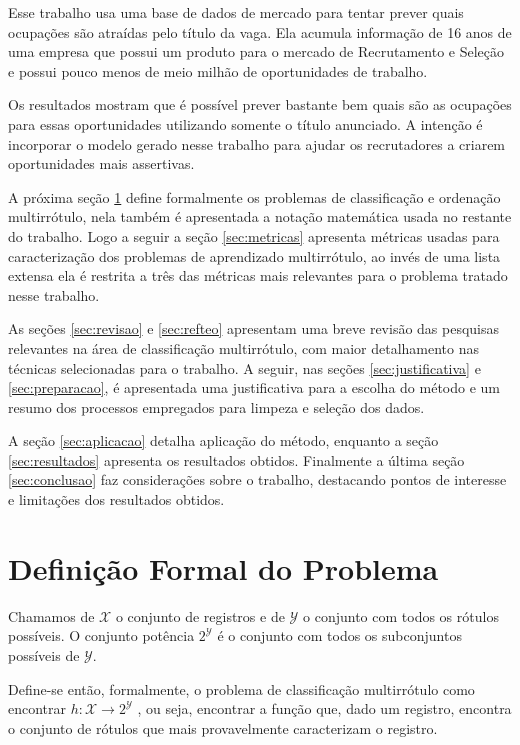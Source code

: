 \documentclass[runningheads,a4paper]{llncs}
\begin{document}
Esse trabalho usa uma base de dados de mercado para tentar prever quais ocupações são atraídas pelo título da vaga. Ela acumula informação de 16 anos de uma empresa que possui um produto para o mercado de Recrutamento e Seleção e possui pouco menos de meio milhão de oportunidades de trabalho.

Os resultados mostram que é possível prever bastante bem quais são as ocupações para essas oportunidades utilizando somente o título anunciado. A intenção é incorporar o modelo gerado nesse trabalho para ajudar os recrutadores a criarem oportunidades mais assertivas.

A próxima seção \ref{sec:formal} define formalmente os problemas de classificação e ordenação multirrótulo, nela também é apresentada a notação matemática usada no restante do trabalho. Logo a seguir a seção \ref{sec:metricas} apresenta métricas usadas para caracterização dos problemas de aprendizado multirrótulo, ao invés de uma lista extensa ela é restrita a três das métricas mais relevantes para o problema tratado nesse trabalho.

As seções \ref{sec:revisao} e \ref{sec:refteo} apresentam uma breve revisão das pesquisas relevantes na área de classificação multirrótulo, com maior detalhamento nas técnicas selecionadas para o trabalho. A seguir, nas seções \ref{sec:justificativa} e \ref{sec:preparacao}, é apresentada uma justificativa para a escolha do método e  um resumo dos processos empregados para limpeza e seleção dos dados.

A seção \ref{sec:aplicacao} detalha aplicação do método, enquanto a seção \ref{sec:resultados} apresenta os resultados obtidos. Finalmente a última seção \ref{sec:conclusao} faz considerações sobre o trabalho, destacando pontos de interesse e limitações dos resultados obtidos.

\section{Definição Formal do Problema} \label{sec:formal}

Chamamos de $\mathcal{X}$ o conjunto de registros e de $\mathcal{Y}$ o conjunto com todos os rótulos possíveis. O conjunto potência $2^{\mathcal{Y}}$ é o conjunto com todos os subconjuntos possíveis de $\mathcal{Y}$.

Define-se então, formalmente, o problema de classificação multirrótulo como encontrar $h : \mathcal{X} \to 2^\mathcal{Y}$ , ou seja, encontrar a função que, dado um registro, encontra o conjunto de rótulos que mais provavelmente caracterizam o registro.
\end{document}
